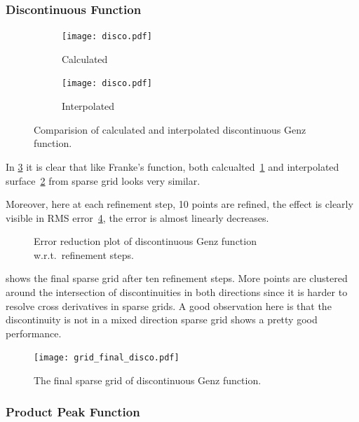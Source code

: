 \subsubsection{Discontinuous Function}\label{sec:discontinuous}

\begin{figure}
    \centering
    \begin{subfigure}{0.45\textwidth}
        \texttt{[image: disco.pdf]}
        \caption{Calculated}
        \label{fig:discocalculated}
    \end{subfigure}
    \begin{subfigure}{0.45\textwidth}
        \texttt{[image: disco.pdf]}
        \caption{Interpolated}
        \label{fig:discointerpolated}
    \end{subfigure}
    \caption{Comparision of calculated and interpolated discontinuous Genz function.}
    \label{fig:discosurface}
\end{figure}

In \cref{fig:discosurface} it is clear that like Franke's function, both calcualted~\cref{fig:discocalculated} and
interpolated surface~\cref{fig:discointerpolated} from sparse grid looks very similar.

Moreover, here at each refinement step, 10 points are refined,
the effect is clearly visible in RMS error~\cref{fig:discoerr}, the error is almost linearly decreases.

\begin{figure}
    \centering
    \scalebox{0.9}{}
    \caption{Error reduction plot of discontinuous Genz function w.r.t.\ refinement steps.}
    \label{fig:discoerr}
\end{figure}

 shows the final sparse grid after ten refinement steps. More points are clustered around the intersection of discontinuities in both directions since it is harder to resolve cross derivatives in sparse grids. A good observation here is that the discontinuity is not in a mixed direction sparse grid shows a pretty good performance.

\begin{figure}
    \centering
    \texttt{[image: grid\_final\_disco.pdf]}
    \caption{The final sparse grid of discontinuous Genz function.}
    \label{fig:discogrid}
\end{figure}

\subsubsection{Product Peak Function}\label{sec:productpeak}

